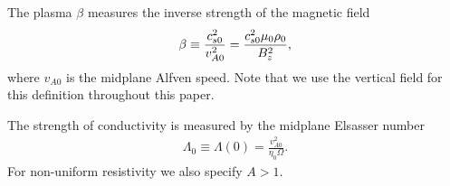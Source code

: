 The plasma $\beta$ measures the inverse strength of the  
magnetic field 
\begin{align}
  \beta \equiv \frac{c_{s0}^2}{v_{A0}^2} =
  \frac{c_{s0}^2\mu_0\rho_0}{B_z^2},  
\end{align}
where $v_{A0}$ is the midplane Alfven speed. Note that we use 
the vertical field for this definition throughout this paper. 

The strength of conductivity is measured by the midplane Elsasser
number   
\begin{align}
  \Lambda_0 \equiv\Lambda(0) =  \frac{v_{A0}^2}{\eta_0\Omega}. 
\end{align}
For non-uniform resistivity we also specify $A > 1$. 

